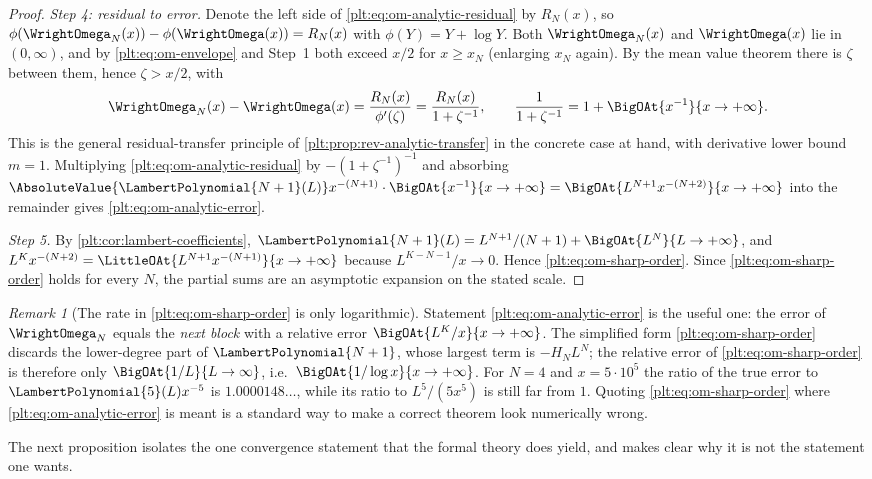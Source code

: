 \documentclass[11pt,oneside]{article}
\theoremstyle{plain}
\theoremstyle{definition}
\theoremstyle{remark}
\newtheorem{remark}[theorem]{Remark}
\newcommand{\LamP}[1]{\LambertPolynomial{#1}}
\begin{document}
\begin{proof}
\emph{Step 4: residual to error.}  Denote the left side of
\eqref{plt:eq:om-analytic-residual} by \(R_N(x)\), so
\(\phi(\WrightOmega_N(x))-\phi(\WrightOmega(x))=R_N(x)\) with
\(\phi(Y)=Y+\log Y\).  Both \(\WrightOmega_N(x)\) and \(\WrightOmega(x)\) lie
in \((0,\infty)\), and by \cref{plt:eq:om-envelope} and Step~1 both exceed
\(x/2\) for \(x\ge x_N\) (enlarging \(x_N\) again).  By the mean value
theorem there is \(\zeta\) between them, hence \(\zeta>x/2\), with
\[
 \WrightOmega_N(x)-\WrightOmega(x)=\frac{R_N(x)}{\phi'(\zeta)}
 =\frac{R_N(x)}{1+\zeta^{-1}},
 \qquad
 \frac{1}{1+\zeta^{-1}}=1+\BigOAt{x^{-1}}{x\to+\infty}.
\]
This is the general residual-transfer principle of
\cref{plt:prop:rev-analytic-transfer} in the concrete case at hand, with
derivative lower bound \(m=1\).  Multiplying
\eqref{plt:eq:om-analytic-residual} by \(-(1+\zeta^{-1})^{-1}\) and absorbing
\(\AbsoluteValue{\LamP{N+1}(L)}x^{-(N+1)}\cdot\BigOAt{x^{-1}}{x\to+\infty}
=\BigOAt{L^{N+1}x^{-(N+2)}}{x\to+\infty}\) into the remainder gives
\eqref{plt:eq:om-analytic-error}.

\emph{Step 5.}  By \cref{plt:cor:lambert-coefficients},
\(\LamP{N+1}(L)=L^{N+1}/(N+1)+\BigOAt{L^{N}}{L\to+\infty}\), and
\(L^{K}x^{-(N+2)}=\LittleOAt{L^{N+1}x^{-(N+1)}}{x\to+\infty}\) because
\(L^{K-N-1}/x\to0\).  Hence \eqref{plt:eq:om-sharp-order}.  Since
\eqref{plt:eq:om-sharp-order} holds for every \(N\), the partial sums are an
asymptotic expansion on the stated scale.
\end{proof}

\begin{remark}[The rate in \eqref{plt:eq:om-sharp-order} is only logarithmic]
\label{plt:rmk:om-slow}
Statement \eqref{plt:eq:om-analytic-error} is the useful one:
the error of \(\WrightOmega_N\) equals the \emph{next block} with a relative
error \(\BigOAt{L^{K}/x}{x\to+\infty}\).  The simplified form
\eqref{plt:eq:om-sharp-order} discards the lower-degree part of
\(\LamP{N+1}\), whose largest term is \(-H_{N}L^{N}\); the relative error of
\eqref{plt:eq:om-sharp-order} is therefore only \(\BigOAt{1/L}{L\to\infty}\),
i.e.\ \(\BigOAt{1/\log x}{x\to+\infty}\).  For \(N=4\) and \(x=5\cdot10^{5}\)
the ratio of the true error to \(\LamP{5}(L)x^{-5}\) is
\(1.0000148\ldots\), while its ratio to \(L^{5}/(5x^{5})\) is still far from
\(1\).  Quoting \eqref{plt:eq:om-sharp-order} where
\eqref{plt:eq:om-analytic-error} is meant is a standard way to make a correct
theorem look numerically wrong.
\end{remark}

The next proposition isolates the one convergence statement that the formal
theory does yield, and makes clear why it is not the statement one wants.
\end{document}
